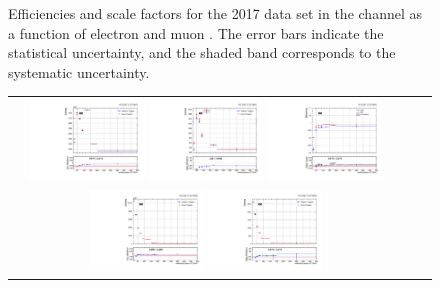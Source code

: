\begin{figure}[htb]
\begin{center}
\begin{tabular}{ccc}
    \end{tabular}
    \caption{Efficiencies and scale factors for the 2017 data set in the \emu channel as a function of electron and muon \pT.
            The error bars indicate the statistical uncertainty, and the shaded band corresponds to the systematic uncertainty.
            }
    \label{TrigSF_2017_1}
  \end{center}
\end{figure}

\begin{figure}[htb]
  \begin{center}
    \begin{tabular}{ccc}
      \includegraphics[width=0.30\textwidth]{fig_2017_TrigSF/g_lepApt_ee_MC.pdf}
      \includegraphics[width=0.30\textwidth]{fig_2017_TrigSF/g_lepApt_ee_data.pdf}
      \includegraphics[width=0.30\textwidth]{fig_2017_TrigSF/g_ee_lepApt_FullSystUncBand.pdf}\\
      \includegraphics[width=0.30\textwidth]{fig_2017_TrigSF/g_lepBpt_ee_MC.pdf}
      \includegraphics[width=0.30\textwidth]{fig_2017_TrigSF/g_lepBpt_ee_data.pdf}

\end{tabular}
\end{center}
\end{figure}
